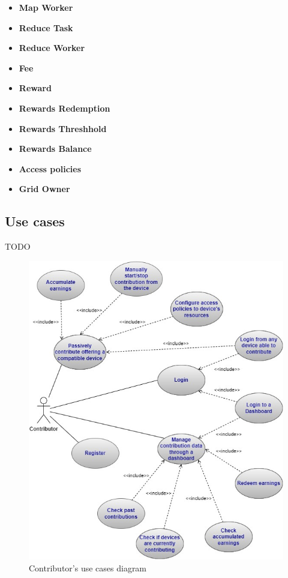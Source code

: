 \begin{itemize}
    \item \textbf{Map Worker}\label{map_worker}\\
    \item \textbf{Reduce Task}\label{reduce_task}\\
    \item \textbf{Reduce Worker}\label{reduce_worker}\\
    \item \textbf{Fee}\label{fee}\\
    \item \textbf{Reward}\label{reward}\\
    \item \textbf{Rewards Redemption}\label{rewards_redemption}\\
    \item \textbf{Rewards Threshhold}\label{rewards_threshold}\\
    \item \textbf{Rewards Balance}\label{rewards_balance}\\
    \item \textbf{Access policies}\label{access_policies}\\
    \item \textbf{Grid Owner}\label{grid_owner}\\
\end{itemize}
\subsection{Use cases}
TODO

\begin{figure}[!ht]
    \centering
    \includegraphics[width=\linewidth]{document/chapters/chapter_5/images/contributor_use_cases.jpg}
    \caption{Contributor's use cases diagram}
    \label{fig:use_cases_contributor}
\end{figure}

